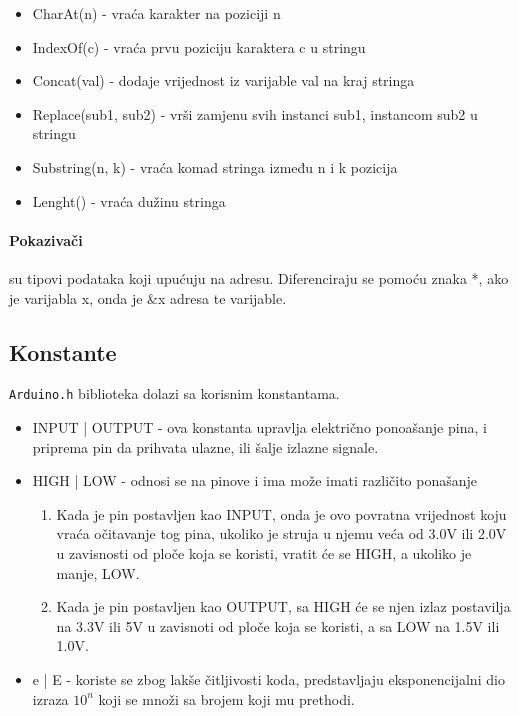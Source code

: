 \documentclass[../Document.tex]{subfiles}
\begin{document}
\begin{itemize}
  \item CharAt(n) - vraća karakter na poziciji n
  \item IndexOf(c) - vraća prvu poziciju karaktera c u stringu
  \item Concat(val) - dodaje vrijednost iz varijable val na kraj stringa
  \item Replace(sub1, sub2) - vrši zamjenu svih instanci sub1, instancom sub2 u stringu
  \item Substring(n, k) - vraća komad stringa između n i k pozicija
  \item Lenght() - vraća dužinu stringa
\end{itemize}

\paragraph{Pokazivači} su tipovi podataka koji upućuju na adresu. Diferenciraju se pomoću znaka *, ako je varijabla x, onda je \&x adresa te varijable.

\subsection{Konstante}

\verb|Arduino.h| biblioteka dolazi sa korisnim konstantama.

\begin{itemize}
  \item INPUT | OUTPUT - ova konstanta upravlja električno ponoašanje pina, i priprema pin da prihvata ulazne, ili šalje izlazne signale.
  \item HIGH | LOW - odnosi se na pinove i ima može imati različito ponašanje
        \begin{enumerate}
          \item Kada je pin postavljen kao INPUT, onda je ovo povratna vrijednost koju vraća očitavanje tog pina, ukoliko je struja u njemu veća od 3.0V ili 2.0V u zavisnosti od ploče koja se koristi, vratit će se HIGH, a ukoliko je manje, LOW.
          \item Kada je pin postavljen kao OUTPUT, sa HIGH će se njen izlaz postavilja na 3.3V ili 5V u zavisnoti od ploče koja se koristi, a sa LOW na 1.5V ili 1.0V.
        \end{enumerate}
  \item e | E - koriste se zbog lakše čitljivosti koda, predstavljaju eksponencijalni dio izraza $10^n$ koji se množi sa brojem koji mu prethodi.
\end{itemize}
\end{document}
